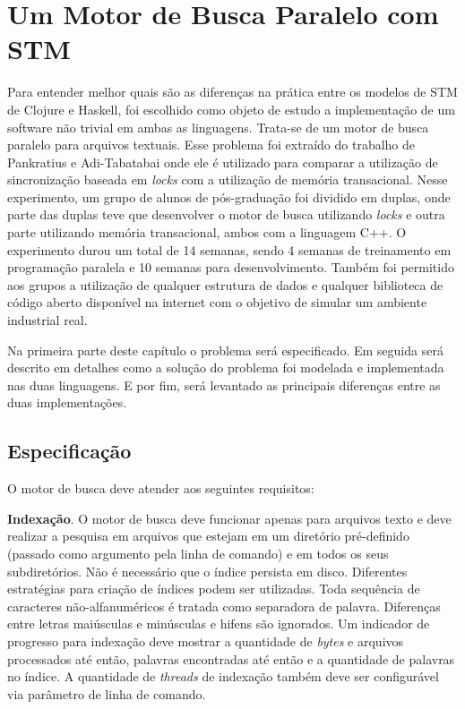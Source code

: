\chapter{Um Motor de Busca Paralelo com STM}

\newcommand{\bigO}[1]{\ensuremath{\operatorname{O}\bigl(#1\bigr)}}

Para entender melhor quais são as diferenças na prática entre os modelos de STM de Clojure e Haskell, foi escolhido como objeto de estudo a implementação de um software não trivial em ambas as linguagens. Trata-se de um motor de busca paralelo para arquivos textuais. Esse problema foi extraído do trabalho de Pankratius e Adi-Tabatabai \cite{pankratius2011study} onde ele é utilizado para comparar a utilização de sincronização baseada em \emph{locks} com a utilização de memória transacional. Nesse experimento, um grupo de alunos de pós-graduação foi dividido em duplas, onde parte das duplas teve que desenvolver o motor de busca utilizando \emph{locks} e outra parte utilizando memória transacional, ambos com a linguagem C++. O experimento durou um total de 14 semanas, sendo 4 semanas de treinamento em programação paralela e 10 semanas para desenvolvimento. Também foi permitido aos grupos a utilização de qualquer estrutura de dados e qualquer biblioteca de código aberto disponível na internet com o objetivo de simular um ambiente industrial real.

Na primeira parte deste capítulo o problema será especificado. Em seguida será descrito em detalhes como a solução do problema foi modelada e implementada nas duas linguagens. E por fim, será levantado as principais diferenças entre as duas implementações.

\section{Especificação}

O motor de busca deve atender aos seguintes requisitos: \cite{pankratius2011study}

\textbf{Indexação}. O motor de busca deve funcionar apenas para arquivos texto e deve realizar a pesquisa em arquivos que estejam em um diretório pré-definido (passado como argumento pela linha de comando) e em todos os seus subdiretórios. Não é necessário que o índice persista em disco. Diferentes estratégias para criação de índices podem ser utilizadas. Toda sequência de caracteres não-alfanuméricos é tratada como separadora de palavra. Diferenças entre letras maiúsculas e minúsculas e hifens são ignorados. Um indicador de progresso para indexação deve mostrar a quantidade de \emph{bytes} e arquivos processados até então, palavras encontradas até então e a quantidade de palavras no índice. A quantidade de \emph{threads} de indexação também deve ser configurável via parâmetro de linha de comando.

